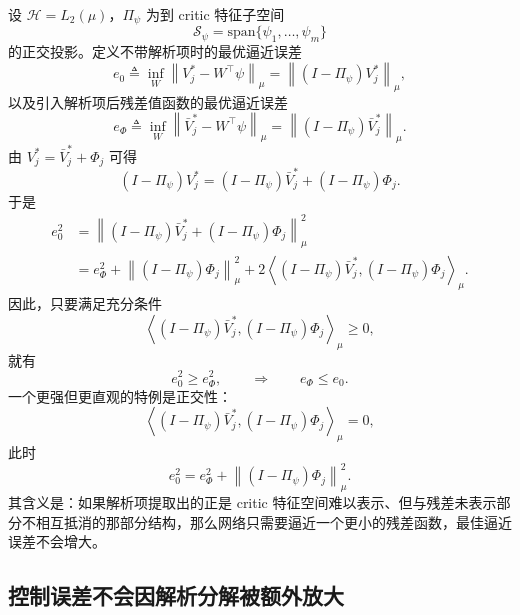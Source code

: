 \documentclass[11pt,a4paper]{article}
\newcommand{\norm}[1]{\left\lVert #1 \right\rVert}
\begin{document}
设 $\mathcal H=L_2(\mu)$，$\Pi_\psi$ 为到 critic 特征子空间
\begin{equation}
\mathcal S_\psi=\text{span}\{\psi_1,\dots,\psi_m\}
\end{equation}
的正交投影。定义不带解析项时的最优逼近误差
\begin{equation}
e_0\triangleq \inf_W \norm{V_j^*-W^\top\psi}_\mu
=\norm{(I-\Pi_\psi)V_j^*}_\mu,
\end{equation}
以及引入解析项后残差值函数的最优逼近误差
\begin{equation}
e_\Phi\triangleq \inf_W \norm{\bar V_j^*-W^\top\psi}_\mu
=\norm{(I-\Pi_\psi)\bar V_j^*}_\mu.
\end{equation}
由 $V_j^*=\bar V_j^*+\Phi_j$ 可得
\begin{equation}
(I-\Pi_\psi)V_j^*
=(I-\Pi_\psi)\bar V_j^*+(I-\Pi_\psi)\Phi_j.
\end{equation}
于是
\begin{align}
e_0^2
&=
\norm{(I-\Pi_\psi)\bar V_j^*+(I-\Pi_\psi)\Phi_j}_\mu^2 \\
&=
e_\Phi^2
+
\norm{(I-\Pi_\psi)\Phi_j}_\mu^2
+
2\left\langle (I-\Pi_\psi)\bar V_j^*,(I-\Pi_\psi)\Phi_j \right\rangle_\mu.
\label{eq:error_compare_expand}
\end{align}
因此，只要满足充分条件
\begin{equation}
\left\langle (I-\Pi_\psi)\bar V_j^*,(I-\Pi_\psi)\Phi_j \right\rangle_\mu \ge 0,
\label{eq:sufficient_nonnegative_cross}
\end{equation}
就有
\begin{equation}
e_0^2 \ge e_\Phi^2,
\qquad\Longrightarrow\qquad
e_\Phi \le e_0.
\label{eq:residual_error_not_worse}
\end{equation}
一个更强但更直观的特例是正交性：
\begin{equation}
\left\langle (I-\Pi_\psi)\bar V_j^*,(I-\Pi_\psi)\Phi_j \right\rangle_\mu =0,
\end{equation}
此时
\begin{equation}
e_0^2=e_\Phi^2+\norm{(I-\Pi_\psi)\Phi_j}_\mu^2.
\end{equation}
其含义是：如果解析项提取出的正是 critic 特征空间难以表示、但与残差未表示部分不相互抵消的那部分结构，那么网络只需要逼近一个更小的残差函数，最佳逼近误差不会增大。

\subsection{控制误差不会因解析分解被额外放大}
\end{document}
